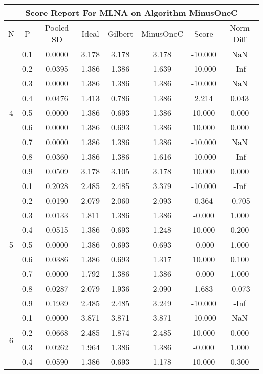 \documentclass[11pt,a4paper]{report}
\begin{document}
\begin{longtable}{ | c | c || c | c | c | c | c | c | }
\hline
\multicolumn{8}{|c|}{ Score Report For MLNA on Algorithm MinusOneC} \\
\hline
N & P & Pooled SD &  Ideal &  Gilbert & MinusOneC  & Score & Norm Diff \\
 \hline
 \hline
 \endhead
\multirow{9}{*}{4} & 0.1 & 0.0000 & 3.178 & 3.178 & 3.178 & -10.000 & NaN \\
 & 0.2 & 0.0395 & 1.386 & 1.386 & 1.639 & -10.000 & -Inf \\
 & 0.3 & 0.0000 & 1.386 & 1.386 & 1.386 & -10.000 & NaN \\
 & 0.4 & 0.0476 & 1.413 & 0.786 & 1.386 & 2.214 & 0.043 \\
 & 0.5 & 0.0000 & 1.386 & 0.693 & 1.386 & 10.000 & 0.000 \\
 & 0.6 & 0.0000 & 1.386 & 0.693 & 1.386 & 10.000 & 0.000 \\
 & 0.7 & 0.0000 & 1.386 & 1.386 & 1.386 & -10.000 & NaN \\
 & 0.8 & 0.0360 & 1.386 & 1.386 & 1.616 & -10.000 & -Inf \\
 & 0.9 & 0.0509 & 3.178 & 3.105 & 3.178 & 10.000 & 0.000 \\
 \hline
\multirow{9}{*}{5} & 0.1 & 0.2028 & 2.485 & 2.485 & 3.379 & -10.000 & -Inf \\
 & 0.2 & 0.0190 & 2.079 & 2.060 & 2.093 & 0.364 & -0.705 \\
 & 0.3 & 0.0133 & 1.811 & 1.386 & 1.386 & -0.000 & 1.000 \\
 & 0.4 & 0.0515 & 1.386 & 0.693 & 1.248 & 10.000 & 0.200 \\
 & 0.5 & 0.0000 & 1.386 & 0.693 & 0.693 & -0.000 & 1.000 \\
 & 0.6 & 0.0386 & 1.386 & 0.693 & 1.317 & 10.000 & 0.100 \\
 & 0.7 & 0.0000 & 1.792 & 1.386 & 1.386 & -0.000 & 1.000 \\
 & 0.8 & 0.0287 & 2.079 & 1.936 & 2.090 & 1.683 & -0.073 \\
 & 0.9 & 0.1939 & 2.485 & 2.485 & 3.249 & -10.000 & -Inf \\
 \hline
\multirow{9}{*}{6} & 0.1 & 0.0000 & 3.871 & 3.871 & 3.871 & -10.000 & NaN \\
 & 0.2 & 0.0668 & 2.485 & 1.874 & 2.485 & 10.000 & 0.000 \\
 & 0.3 & 0.0262 & 1.964 & 1.386 & 1.386 & -0.000 & 1.000 \\
 & 0.4 & 0.0590 & 1.386 & 0.693 & 1.178 & 10.000 & 0.300 \\

\end{longtable}
\end{document}
